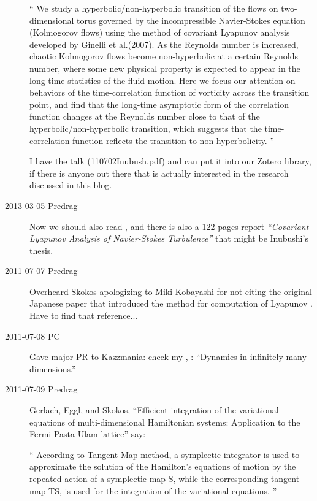 \begin{description}
``
We study a hyperbolic/non-hyperbolic transition of the flows on
two-dimensional torus governed by the incompressible Navier-Stokes
equation (Kolmogorov flows) using the method of covariant Lyapunov
analysis developed by Ginelli et al.(2007). As the Reynolds number is
increased, chaotic Kolmogorov flows become non-hyperbolic at a certain
Reynolds number, where some new physical property is expected to appear
in the long-time statistics of the fluid motion. Here we focus our
attention on behaviors of the time-correlation function of vorticity
across the transition point, and find that the long-time asymptotic form
of the correlation function changes at the Reynolds number close to that
of the hyperbolic/non-hyperbolic transition, which suggests that the
time-correlation function reflects the transition to non-hyperbolicity.
''

I have the talk (110702Inubush.pdf) and can put it into our Zotero
library, if there is anyone out there that is actually interested in the
research discussed in this blog.

\item[2013-03-05 Predrag]
Now we should also read , and there is also a 122
pages report \emph{``Covariant Lyapunov Analysis of Navier-Stokes
Turbulence''} that might be Inubushi's thesis.

\item[2011-07-07 Predrag] Overheard Skokos apologizing to Miki Kobayashi
for not citing the original Japanese paper that introduced the method for
computation of Lyapunov {\cLvs}. Have to find that reference...

\item[2011-07-08 PC]                                        \toCB
Gave major PR to Kazzmania: check my
,
: ``Dynamics in infinitely many dimensions.''


\item[2011-07-09 Predrag]
Gerlach, Eggl, and {Skokos},
``Efficient integration of the variational equations of
    multi-dimensional {Hamiltonian} systems: {Application} to the
    {Fermi-Pasta-Ulam} lattice'' say:

``
According to Tangent Map method, a symplectic integrator is used to
approximate the solution of the Hamilton's equations of motion by the
repeated action of a symplectic map S, while the corresponding tangent
map TS, is used for the integration of the variational equations.
''


\end{description}
